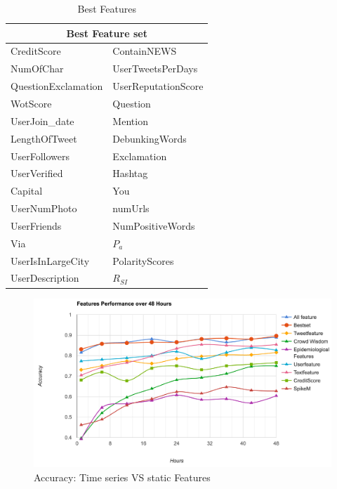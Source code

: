  \begin{table}[!h]
\centering
\begin{tabular}{l|l}
\hline

\multicolumn{2}{c}{Best Feature set} \\\hline

 CreditScore & ContainNEWS \\

NumOfChar  & UserTweetsPerDays\\
QuestionExclamation  & UserReputationScore\\ 
 
WotScore  & Question\\
UserJoin\_date  & Mention\\
LengthOfTweet  & DebunkingWords\\
UserFollowers  & Exclamation\\
UserVerified  &  Hashtag\\

Capital   & You\\
UserNumPhoto   & numUrls\\
UserFriends   & NumPositiveWords\\
Via   & $P_a$\\

UserIsInLargeCity  & PolarityScores \\UserDescription  & $R_{SI}$  \\ \bottomrule 
 \end{tabular}
\caption{Best Features}
\label{bestfeature}
\end{table}

 \begin{figure}[!h]
\centering
\includegraphics[width=\columnwidth]{images/allfeatures.png}
\caption{Accuracy: Time series VS static Features}
\label{fig:allfeature}
\end{figure}
 
